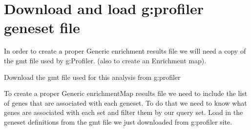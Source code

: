 \documentclass[
]{book}
\newenvironment{Shaded}{\begin{snugshade}}{\end{snugshade}}
\newcommand{\AttributeTok}[1]{\textcolor[rgb]{0.13,0.29,0.53}{#1}}
\newcommand{\CommentTok}[1]{\textcolor[rgb]{0.56,0.35,0.01}{\textit{#1}}}
\newcommand{\ControlFlowTok}[1]{\textcolor[rgb]{0.13,0.29,0.53}{\textbf{#1}}}
\newcommand{\FunctionTok}[1]{\textcolor[rgb]{0.13,0.29,0.53}{\textbf{#1}}}
\newcommand{\NormalTok}[1]{#1}
\newcommand{\OtherTok}[1]{\textcolor[rgb]{0.56,0.35,0.01}{#1}}
\newcommand{\SpecialCharTok}[1]{\textcolor[rgb]{0.81,0.36,0.00}{\textbf{#1}}}
\newcommand{\StringTok}[1]{\textcolor[rgb]{0.31,0.60,0.02}{#1}}
\begin{document}
\section{Download and load g:profiler geneset file}\label{download-and-load-gprofiler-geneset-file}

In order to create a proper Generic enrichment results file we will need a copy of the gmt file used by g:Profiler. (also to create an Enrichment map).

Download the gmt file used for this analysis from g:profiler

\begin{Shaded}
\end{Shaded}

To create a proper Generic enrichmentMap results file we need to include the list of genes that are associated with each geneset. To do that we need to know what genes are associated with each set and filter them by our query set. Load in the geneset definitions from the gmt file we just downloaded from g:profiler site.
\end{document}
